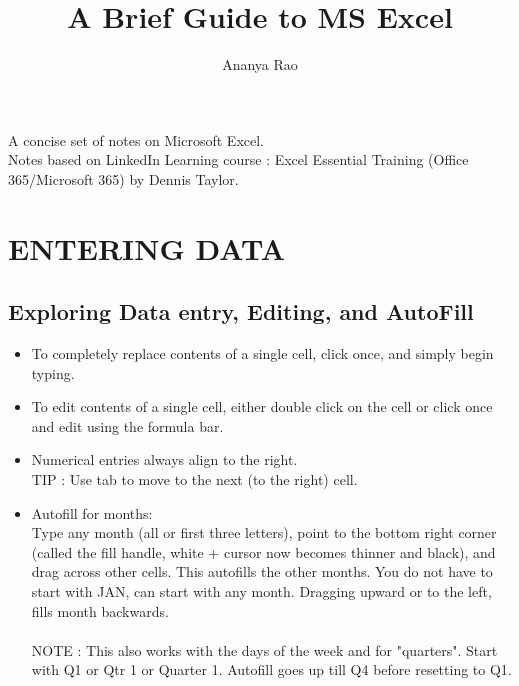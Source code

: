 \documentclass[11pt, oneside]{article}   	%
\title{A Brief Guide to MS Excel}
\author{Ananya Rao}
\begin{document}
\null  %
\nointerlineskip  %
\vfill
\let\snewpage \newpage
\let\newpage \relax
\maketitle
\begin{center}
A concise set of notes on Microsoft Excel. \\
 \bigskip
Notes based on LinkedIn Learning course : Excel Essential Training (Office 365/Microsoft 365) by Dennis Taylor.
\end{center}
\let \newpage \snewpage
\vfill 
\pagebreak
\tableofcontents
\pagebreak
\section {ENTERING DATA} 
\subsection{Exploring Data entry, Editing, and AutoFill}
\begin{itemize}
\item To completely replace contents of a single cell, click once, and simply begin typing. 
\item To edit contents of a single cell, either double click on the cell or click once and edit using the formula bar. 
\item Numerical entries always align to the right.
\bigskip \\
\indent TIP : Use tab to move to the next (to the right) cell. \\
\item Autofill for months: \\
	Type any month (all or first three letters), point to the bottom right corner (called the fill handle, white + cursor now becomes thinner and black), and drag across other cells. This autofills the other months. You do not have to start with JAN, can start with any month. Dragging upward or to the left, fills month backwards. \\
	\bigskip \\
	\indent NOTE : This also works with the days of the week and for "quarters". Start with Q1 or Qtr 1 or Quarter 1. Autofill goes up till Q4 before resetting to Q1.
\end{itemize}
\end{document}
